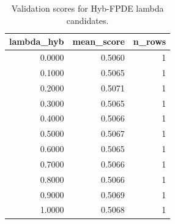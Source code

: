 \begin{table}[t]
\caption{Validation scores for Hyb-FPDE lambda candidates.}
\label{tab:lambda_distribution_computed}
\centering
\begin{tabular}{rrr}
\toprule
lambda\_hyb & mean\_score & n\_rows \\
\midrule
0.0000 & 0.5060 & 1 \\
0.1000 & 0.5065 & 1 \\
0.2000 & 0.5071 & 1 \\
0.3000 & 0.5065 & 1 \\
0.4000 & 0.5066 & 1 \\
0.5000 & 0.5067 & 1 \\
0.6000 & 0.5065 & 1 \\
0.7000 & 0.5066 & 1 \\
0.8000 & 0.5066 & 1 \\
0.9000 & 0.5069 & 1 \\
1.0000 & 0.5068 & 1 \\
\bottomrule
\end{tabular}

\end{table}
